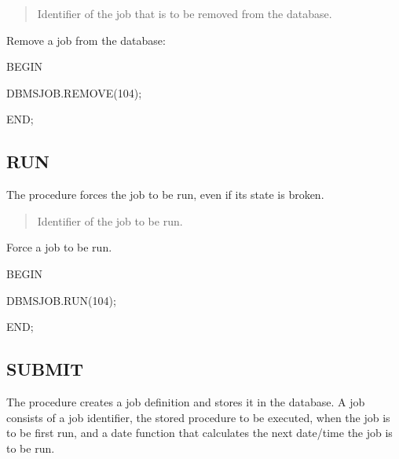 \documentclass[letterpaper,10pt,english,openany,oneside]{sphinxmanual}
\begin{document}


\begin{quote}

Identifier of the job that is to be removed from the database.
\end{quote}


Remove a job from the database:

%
\begin{sphinxVerbatim}[commandchars=\\\{\}]
BEGIN

   DBMS\PYGZus{}JOB.REMOVE(104);

END;
\end{sphinxVerbatim}

\newpage


\subsection{RUN}
\label{\detokenize{run::doc}}\label{\detokenize{run:run}}
The  procedure forces the job to be run, even if its state is broken.



\begin{quote}

Identifier of the job to be run.
\end{quote}


Force a job to be run.

%
\begin{sphinxVerbatim}[commandchars=\\\{\}]
BEGIN

   DBMS\PYGZus{}JOB.RUN(104);

END;
\end{sphinxVerbatim}

\newpage


\subsection{SUBMIT}
\label{\detokenize{submit::doc}}\label{\detokenize{submit:submit}}
The  procedure creates a job definition and stores it in the
database. A job consists of a job identifier, the stored procedure to be
executed, when the job is to be first run, and a date function that
calculates the next date/time the job is to be run.
\end{document}
